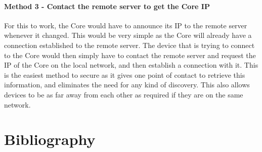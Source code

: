 \documentclass[10pt, a4paper]{article}
\begin{document}
\paragraph{Method 3 - Contact the remote server to get the Core IP} For this to work, the Core would have to announce its IP to the remote server whenever it changed. This would be very simple as the Core will already have a connection established to the remote server. The device that is trying to connect to the Core would then simply have to contact the remote server and request the IP of the Core on the local network, and then establish a connection with it. This is the easiest method to secure as it gives one point of contact to retrieve this information, and eliminates the need for any kind of discovery. This also allows devices to be as far away from each other as required if they are on the same network.

\newpage
\section{Bibliography}


\end{document}

